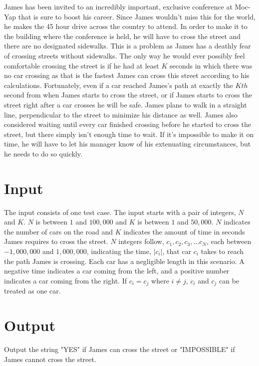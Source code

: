 
James has been invited to an incredibly important, exclusive conference at Moc-Yap that 
is sure to boost his career. Since James wouldn't miss this for the world,
he makes the 45 hour drive across the country to attend. 
In order to make it to the building where the conference is held,
he will have to cross the street and there are no designated 
sidewalks. This is a problem as James has a deathly 
fear of crossing streets without sidewalks. The only way he would ever possibly feel 
comfortable crossing the street is if he had at least $K$ seconds in which 
there was no car crossing as that is the fastest James can cross this street 
according to his calculations. Fortunately, even if a car reached James's
path at exactly the $Kth$ second from when James starts to cross the street, or if James
starts to cross the street right after a car crosses he will be safe. James plans to walk
in a straight line, perpendicular to the street to minimize his distance as well. James also considered
waiting until every car finished crossing before he started to cross the street, but there simply isn't enough
time to wait. If it's impossible to make it on time, he will have to let his manager know of his 
extenuating circumstances, but he needs to do so quickly.

\section*{Input}

The input consists of one test case. The input starts with a pair of integers, 
$N$ and $K$. $N$ is between $1$ and $100,000$ and $K$ is between $1$ and $50,000$. 
$N$ indicates the number of cars on the road and $K$ indicates the amount of 
time in seconds James requires to cross the street.
$N$ integers follow, $c_1, c_2, c_3, \dots c_N$, each between $-1,000,000$
and $1,000,000$, indicating the time, $|c_i|$, that car $c_i$ takes
to reach the path James is crossing. Each car has a negligible length in this scenario.
A negative time indicates a car coming from the left, and a positive 
number indicates a car coming from the right. If $c_i = c_j$ where $i \ne j$, 
$c_i$ and $c_j$ can be treated as one car.

\section*{Output}

Output the string "YES" if James can cross the street 
or "IMPOSSIBLE" if James cannot cross the street.